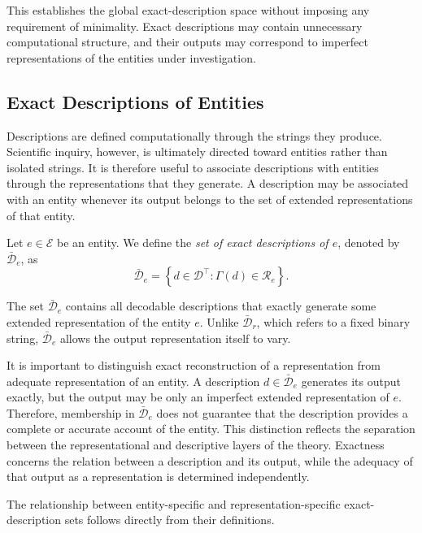 This establishes the global exact-description space without imposing any requirement of minimality. Exact descriptions may contain unnecessary computational structure, and their outputs may correspond to imperfect representations of the entities under investigation.


\subsection*{Exact Descriptions of Entities}

Descriptions are defined computationally through the strings they produce. Scientific inquiry, however, is ultimately directed toward entities rather than isolated strings. It is therefore useful to associate descriptions with entities through the representations that they generate. A description may be associated with an entity whenever its output belongs to the set of extended representations of that entity.

\begin{definition}
\label{def:descriptions_for_entity}
Let $e\in\mathcal{E}$ be an entity. We define the \emph{set of exact descriptions of $e$}, denoted by $\bar{\mathcal{D}}_e$, as
\[
\bar{\mathcal{D}}_e = \left\{d\in\mathcal{D}^\top:\Gamma(d)\in\mathcal{R}_e\right\}.
\]
\end{definition}

The set $\bar{\mathcal{D}}_e$ contains all decodable descriptions that exactly generate some extended representation of the entity $e$. Unlike $\bar{\mathcal{D}}_r$, which refers to a fixed binary string, $\bar{\mathcal{D}}_e$ allows the output representation itself to vary.

It is important to distinguish exact reconstruction of a representation from adequate representation of an entity. A description $d\in\bar{\mathcal{D}}_e$ generates its output exactly, but the output may be only an imperfect extended representation of $e$. Therefore, membership in $\bar{\mathcal{D}}_e$ does not guarantee that the description provides a complete or accurate account of the entity. This distinction reflects the separation between the representational and descriptive layers of the theory. Exactness concerns the relation between a description and its output, while the adequacy of that output as a representation is determined independently.

The relationship between entity-specific and representation-specific exact-description sets follows directly from their definitions.

